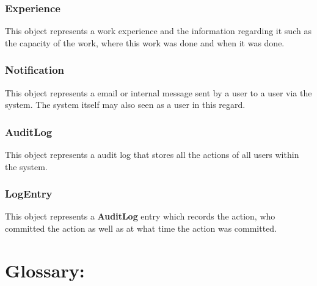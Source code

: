 \documentclass[12pt]{article}
\begin{document}
\subsubsection{Experience}
This object represents a work experience and the information regarding it such as the capacity of the work, where this work was done and when it was done.

\subsubsection{Notification}
This object represents a email or internal message sent by a user to a user via the system. The system itself may also seen as a user in this regard.

\subsubsection{AuditLog}
This object represents a audit log that stores all the actions of all users within the system.

\subsubsection{LogEntry}
This object represents a \textbf{AuditLog} entry which records the action, who committed the action as well as at what time the action was committed.



\newpage	

\newpage
\section{Glossary:}
\vspace{0.2in}
\end{document}
